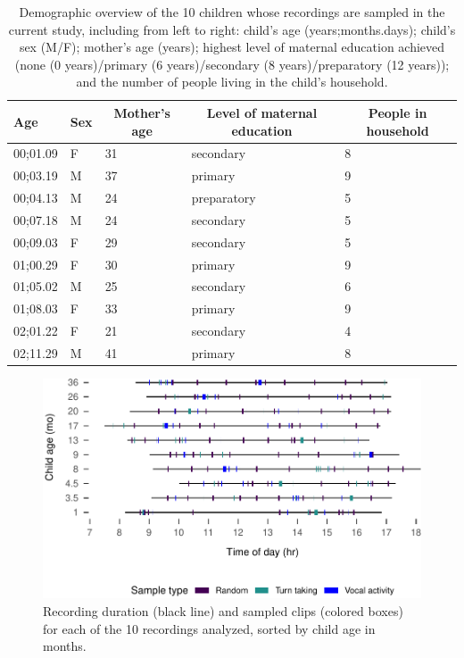 \documentclass[,man,mask,floatsintext]{apa6}
\begin{document}
\begin{table}[tbp]
\begin{center}
\begin{threeparttable}
\caption{\label{tab:tab1}Demographic overview of the 10 children whose recordings are sampled in the current study, including from left to right: child's age (years;months.days); child's sex (M/F); mother's age (years); highest level of maternal education achieved (none (0 years)/primary (6 years)/secondary (8 years)/preparatory (12 years)); and the number of people living in the child's household.}
\begin{tabular}{lllll}
\toprule
Age & \multicolumn{1}{c}{Sex} & \multicolumn{1}{c}{Mother's age} & \multicolumn{1}{c}{Level of maternal education} & \multicolumn{1}{c}{People in household}\\
\midrule
00;01.09 & F & 31 & secondary & 8\\
00;03.19 & M & 37 & primary & 9\\
00;04.13 & M & 24 & preparatory & 5\\
00;07.18 & M & 24 & secondary & 5\\
00;09.03 & F & 29 & secondary & 5\\
01;00.29 & F & 30 & primary & 9\\
01;05.02 & M & 25 & secondary & 6\\
01;08.03 & F & 33 & primary & 9\\
02;01.22 & F & 21 & secondary & 4\\
02;11.29 & M & 41 & primary & 8\\
\bottomrule
\end{tabular}
\end{threeparttable}
\end{center}
\end{table}

\begin{figure}
\centering
\includegraphics{Yeli-CLE_files/figure-latex/fig1-1.pdf}
\caption{\label{fig:fig1}Recording duration (black line) and sampled clips
(colored boxes) for each of the 10 recordings analyzed, sorted by child
age in months.}
\end{figure}
\end{document}
